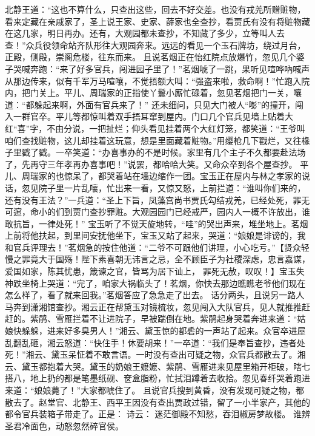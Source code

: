 \documentclass[12pt,oneside]{book}
\begin{document}
北静王道：“这也不算什么，只查出这些，回去不好交差。也没有戎羌所赠赃物，看来定藏在亲戚家了，圣上说王家、史家、薛家也全查抄，看贾氏有没有将赃物藏在这几家，明日再办。还有，大观园都未查抄，不知藏了多少，立等叫人去查！”众兵役领命站齐队形往大观园奔来。远远的看见一个玉石牌坊，绕过月台，正殿，侧殿，崇阁危楼，往东而来。
且说茗烟正在怡红院点放爆竹，忽见几个婆子哭喊奔跑：“来了好多官兵，闯进园子里了！”茗烟唬了一跳，果听见喧哗吶喊声从那边传来，似有千军万马喧嚷，不觉捂额大叫：“强盗来啦，救命啊！”忙跑入院内，把门关上。平儿、周瑞家的正指使丫鬟小厮忙碌着，忽见茗烟把门一关，嚷道：“都躲起来啊，外面有官兵来了！”
还未细问，只见大门被人“嘭”的撞开，闯入一群官卒。平儿等都惊叫着双手捂耳窜到屋内。门口几个官兵见墙上贴着大红“喜”字，不由分说，一把扯烂；仰头看见挂着两个大红灯笼，都笑道：“王爷叫咱们查找赃物，这儿却挂着这玩意，想是里面藏着赃物。”用缨枪几下戳烂，又往椽子里戳了戳。一卒笑道：“办喜事办的不是时候。家里有几个主子不久都要赴法场了，先再守三年孝再办喜事吧！”说罢，都哈哈大笑。又命众卒到各个屋查抄。
平儿、周瑞家的也惊呆了，都哭着站在墙边缩作一团。宝玉正在屋内与林之孝家的说话，忽见院子里一片乱嚷，忙出来一看，又惊又怒，上前拦道：“谁叫你们来的，还有没有王法？”一兵道：“圣上下旨，凤藻宫尚书贾氏勾结戎羌，已经处死，罪无可逭，命小的们到贾门查抄罪赃。大观园园门已经戒严，园内人一概不许放出，谁敢抗旨，一律处死！”
宝玉听了不觉天旋地转，“哇”的哭出声来，堆坐地上。茗烟上前将他扶起，到里间安抚他坐下，宝玉又站了起来，哭道：“娘娘是诽谤的，我和官兵评理去！”茗烟急的按住他道：“二爷不可跟他们讲理，小心吃亏。”【贤众轻慢之罪竟大于国殇！陛下素喜朝无讳言之忌，全不顾臣子为社稷深虑，忠言嘉谋，爱国如家，陈其忧患，箴谏之官，皆骂为居下讪上， 罪死无赦，叹叹！】宝玉失神跌坐椅上哭道：“完了，咱家大祸临头了！茗烟，你快去那边瞧瞧老爷他们现在怎么样了，看了就来回我。”茗烟答应了急急走了出去。
话分两头，且说另一路人马奔到潇湘馆查抄。湘云正在帮黛玉对镜梳妆，忽见闯入大队官兵，见人就推推赶赶的。紫鹃、雪雁拦着不让进院子，早被踹倒在地。紫鹃起身哭着奔进来道：“姑娘快躲躲，进来好多臭男人！”湘云、黛玉惊的都砉的一声站了起来。众官卒进屋乱翻乱砸，湘云怒道：“快住手！休要胡来！”一卒道：“我们是奉旨查抄，违者处死！”湘云、黛玉呆怔着不敢言语。一时没有查出可疑之物，众官兵都散去了。湘云、黛玉都抱着大哭。黛玉的奶娘王嬷嬷、紫鹃、雪雁进来见屋里箱开柜破，瞎七搭八，地上扔的都是笔墨纸砚、奁盒脂粉，忙拭泪蹲着去收拾。忽见春纤哭着跑进来道：“娘娘薨了！”大家都唬住了。
且说官兵搜到黄昏，没有发现可疑之物，都散去了。赵堂官、北静王、西平王因没有查出贾政过错，留了一小半家产，其他的都令官兵装箱子带走了。正是：
诗云：
迷茫御殿不知愁，吞泪椒房梦故楼。
谁辨圣君冷面色，动怒忽然碎官侯。
\end{document}
